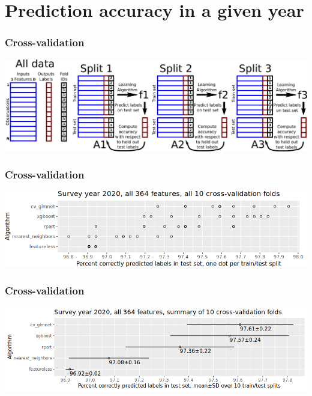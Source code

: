 \documentclass{beamer}
\begin{document}
\section{Prediction accuracy in a given year}

\begin{frame}
  \frametitle{Cross-validation}
  \includegraphics[width=\textwidth]{drawing-cross-validation.pdf}
\end{frame}

\begin{frame}
  \frametitle{Cross-validation}
  \includegraphics[width=\textwidth]{download-nsch-mlr3batchmark-registry-one-set-all-features.png}
\end{frame}

\begin{frame}
  \frametitle{Cross-validation}
  \includegraphics[width=\textwidth]{download-nsch-mlr3batchmark-registry-one-set-all-features-stats.png}
\end{frame}
\end{document}
